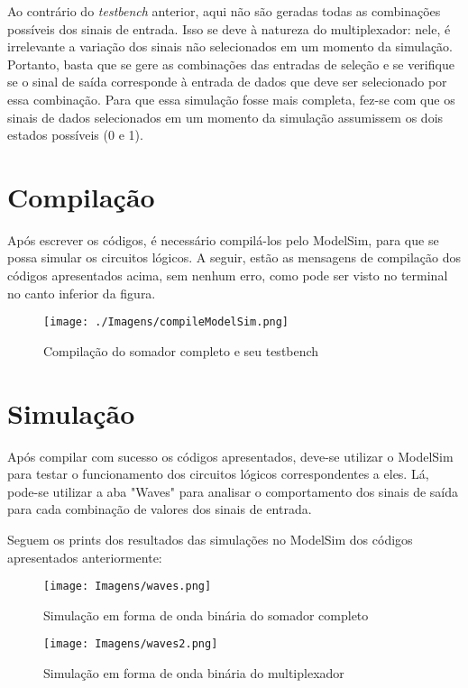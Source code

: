 \documentclass[a4paper,12pt]{article}
\begin{document}
Ao contrário do \textit{testbench} anterior, aqui não são geradas todas as combinações possíveis dos sinais de entrada. Isso se deve à natureza do multiplexador: nele, é irrelevante a variação dos sinais não selecionados em um momento da simulação. Portanto, basta que se gere as combinações das entradas de seleção e se verifique se o sinal de saída corresponde à entrada de dados que deve ser selecionado por essa combinação. Para que essa simulação fosse mais completa, fez-se com que os sinais de dados selecionados em um momento da simulação assumissem os dois estados possíveis (0 e 1).

\section{Compilação}
Após escrever os códigos, é necessário compilá-los pelo ModelSim, para que se possa simular os circuitos lógicos. A seguir, estão as mensagens de compilação dos códigos apresentados acima, sem nenhum erro, como pode ser visto no terminal no canto inferior da figura.
\begin{figure}[H]
    \centering
    \texttt{[image: ./Imagens/compileModelSim.png]}
    \caption{Compilação do somador completo e seu testbench}
\end{figure}

\section{Simulação}
Após compilar com sucesso os códigos apresentados, deve-se utilizar o ModelSim para testar o funcionamento dos circuitos lógicos correspondentes a eles. Lá, pode-se utilizar a aba "Waves" para analisar o comportamento dos sinais de saída para cada combinação de valores dos sinais de entrada.

Seguem os prints dos resultados das simulações no ModelSim dos códigos apresentados anteriormente:

\begin{figure}[H]
    \centering
    \texttt{[image: Imagens/waves.png]}
    \caption{Simulação em forma de onda binária do somador completo}
\end{figure}

\begin{figure}[H]
    \centering
    \texttt{[image: Imagens/waves2.png]}
    \caption{Simulação em forma de onda binária do multiplexador}
\end{figure}
\end{document}
